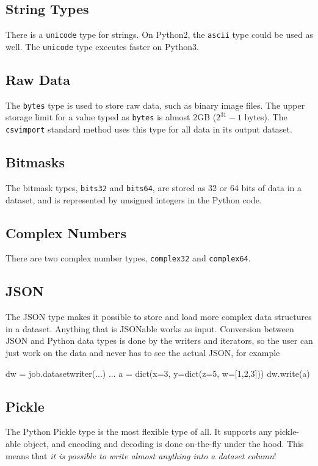\subsection{String Types}
There is a \texttt{unicode} type for strings.  On Python2, the
\texttt{ascii} type could be used as well.  The \texttt{unicode}
type executes faster on Python3.


\subsection{Raw Data}

The \texttt{bytes} type is used to store raw data, such as binary
image files.  The upper storage limit for a value typed
as \texttt{bytes} is almost 2GB ($2^{31}-1$ bytes).
The \texttt{csvimport} standard method uses this type for all data in
its output dataset.


\subsection{Bitmasks}
The bitmask types, \texttt{bits32} and \texttt{bits64}, are stored as
32 or 64 bits of data in a dataset, and is represented by unsigned
integers in the Python code.


\subsection{Complex Numbers}
There are two complex number types, \texttt{complex32}
and \texttt{complex64}.


\subsection{JSON}
The JSON type makes it possible to store and load more complex data
structures in a dataset.  Anything that is JSONable works as input.
Conversion between JSON and Python data types is done by the writers
and iterators, so the user can just work on the data and never has to
see the actual JSON, for example
\begin{python}
dw = job.datasetwriter(...)
...
a = dict(x=3, y=dict(z=5, w=[1,2,3]))
dw.write(a)
\end{python}



\subsection{Pickle}
The Python Pickle type is the most flexible type of all.  It supports
any pickle-able object, and encoding and decoding is done on-the-fly
under the hood.  This means that \textsl{it is possible to write almost
anything into a dataset column}!



